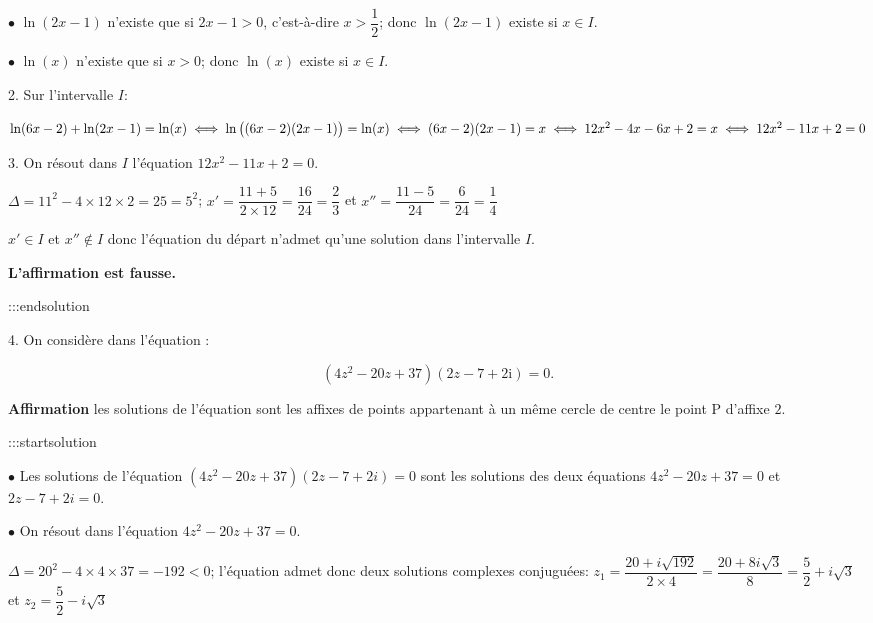 \documentclass{cornouaille}
\begin{document}
$\bullet$  $\ln\left (2x-1\right )$ n'existe que si $2x-1>0$, c'est-à-dire $x>\dfrac{1}{2}$; donc $\ln\left (2x-1\right )$ existe si $x\in I$.


$\bullet$  $\ln\left (x\right )$ n'existe que si $x>0$; donc $\ln\left (x\right )$ existe si $x\in I$.






2.  Sur l'intervalle $I$:

$\ln (6 x - 2) + \ln (2x - 1) = \ln (x)
\iff \ln \left ((6 x - 2)(2x - 1)\strut\right ) = \ln (x)
\iff  (6 x - 2)(2x - 1) = x \newline
\iff 12x^2 - 4x - 6x + 2 = x
\iff 12x^2 -11x +2=0$


3.  On résout dans $I$ l'équation $12x^2 -11x +2=0$.

$\Delta = 11^2 - 4\times 12\times 2 = 25 = 5^2$;
$x'=\dfrac{11+5}{2\times 12} = \dfrac{16}{24}=\dfrac{2}{3}$ et
$x''=\dfrac{11-5}{24}=\dfrac{6}{24}= \dfrac{1}{4}$

$x'\in I$ et $x'' \not\in I$ donc l'équation du départ n'admet qu'une solution dans l'intervalle $I$.




\textbf{L'affirmation est fausse.}


:::endsolution


4.   On considère dans  l'équation :


$$
\left(4z^2 - 20z + 37\right)(2z -7 + 2\text{i}) = 0.
$$




\textbf{Affirmation} les solutions de l'équation sont les affixes de points appartenant à un même
cercle de centre le point P d'affixe $2$.


:::startsolution







$\bullet$  Les solutions de l'équation $\left(4z^2 - 20z + 37\right)(2z -7 + 2i) = 0$ sont les solutions des deux équations $4z^2 - 20z + 37 = 0$ et $2z -7 + 2i = 0$.


$\bullet$  On résout dans  l'équation $4z^2 - 20z + 37 = 0$.

$\Delta=20^2 - 4\times 4\times 37 = -192<0$; l'équation admet donc deux solutions complexes conjuguées:
$z_1 = \dfrac{20 + i \sqrt{192}}{2\times 4} = \dfrac{20 + 8i \sqrt{3}}{8} = \dfrac{5}{2}+i\sqrt{3}$ et $z_2 = \dfrac{5}{2} - i\sqrt{3}$
\end{document}
